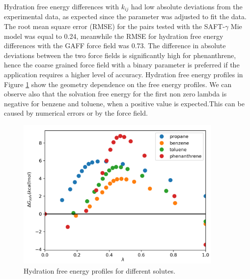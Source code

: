 Hydration free energy differences with $k_{ij}$ had low absolute deviations from the experimental data, as expected since the parameter was adjusted to fit the data. The root mean square error (RMSE) for the pairs tested with the SAFT-$\gamma$ 	Mie model was equal to 0.24, meanwhile the RMSE for hydration free energy differences with the GAFF force field \cite{PMID:24928188} was 0.73. The difference in absolute deviations between the two force fields is significantly high for phenanthrene, hence the coarse grained force field with a binary parameter is preferred if the application requires a higher level of accuracy. Hydration free energy profiles in Figure \ref{fig:water} show the geometry  dependence on the free energy profiles. We can observe also that the solvation free energy for the first non zero lambda is negative for benzene and toluene, when a positive value is expected.This can be caused by numerical errors or by the force field. 


\begin{figure}[H]
\centering
\includegraphics[width=0.9\textwidth]{Figures/water}
\caption{Hydration free energy profiles for different solutes.}
\label{fig:water}
\end{figure}


